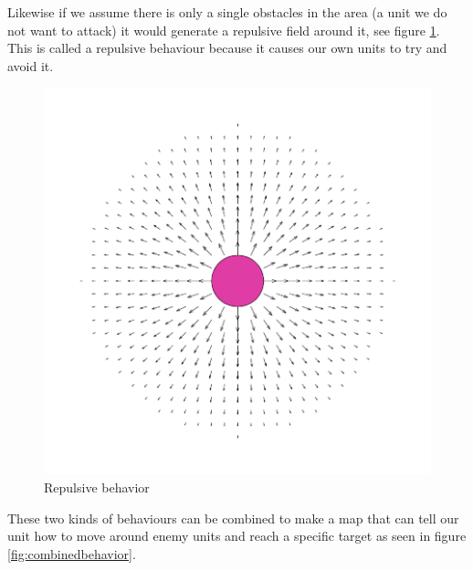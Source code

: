 	Likewise if we assume there is only a single obstacles in the area (a unit we do not want to attack) it would generate a repulsive field around it, 
	see figure \ref{fig:avoidbehavior}. This is called a repulsive behaviour because it causes our own units to try and avoid it.

		
	\begin{figure}[H]
		\begin{center}
			\includegraphics[scale=0.3]{Figures/Potentialfields/avoid.png}
			\caption{Repulsive behavior\cite{pft}}\label{fig:avoidbehavior}
		\end{center}
	\end{figure}
	\pagebreak
	These two kinds of behaviours can be combined to make a map that can tell our unit 
	how to move around enemy units and reach a specific target as seen in figure \ref{fig:combinedbehavior}.
			
